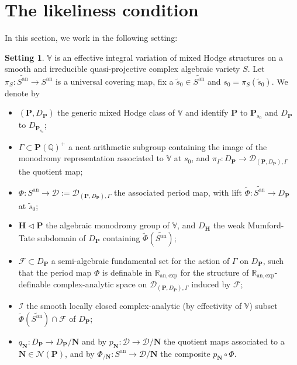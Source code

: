 \documentclass[10pt]{article}
\numberwithin{equation}{subsection}
\theoremstyle{plain}
\theoremstyle{definition}
\newtheorem{setting}[theorem]{Setting}
\theoremstyle{remark}
\newcommand{\I}{\mathscr{I}}
\newcommand{\F}{\mathscr{F}}
\newcommand{\anexp}{\mathbb{R}_\mathrm{an,exp}}
\newcommand{\Q}{\mathbb Q}
\newcommand{\V}{\mathbb V}
\newcommand{\pp}{\mathbf P}
\newcommand{\mon}{\mathbf H}
\newcommand{\NN}{\mathbf N}
\newcommand{\an}{\mathrm{an}}
\newcommand{\period}{\mathscr{D}}
\newcommand{\Np}{\mathcal{N}(\pp)}
\begin{document}
\section{The likeliness condition}\label{sect7}
In this section, we work in the following setting:
\begin{setting}\label{setting}
$\V$ is an effective integral variation of mixed Hodge structures on a smooth and irreducible quasi-projective complex algebraic variety $S$. Let $\pi_S : \widetilde{S^\an} \rightarrow S^\an$ is a universal covering map, fix a $\tilde{s}_0 \in \widetilde{S^\an}$ and $s_0 = \pi_S(\tilde{s}_0)$. We denote by
\begin{itemize}
\item $(\pp,D_\pp)$ the generic mixed Hodge class of $\V$ and identify $\pp$ to $\pp_{s_0}$ and $D_\pp$ to $D_{\pp_{s_0}}$;
\item $\Gamma \subset \pp(\Q)^+$ a neat arithmetic subgroup containing the image of the monodromy representation associated to $\V$ at $s_0$, and $\pi_\Gamma : D_\pp \rightarrow \period_{(\pp, D_\pp), \Gamma}$ the quotient map;
\item $\Phi : S^\an \rightarrow \period := \period_{(\pp,D_\pp), \Gamma}$ the associated period map, with lift $\tilde{\Phi} : \widetilde{S^\an} \rightarrow D_\pp$ at $\tilde{s}_0$;
\item $\mon \triangleleft \pp$ the algebraic monodromy group of $\V$, and $D_{\mon}$ the weak Mumford-Tate subdomain of $D_\pp$ containing $\tilde{\Phi}(\widetilde{S^\an})$;
\item $\F \subset D_\pp$ a semi-algebraic fundamental set for the action of $\Gamma$ on $D_\pp$, such that the period map $\Phi$ is definable in $\anexp$ for the structure of $\anexp$-definable complex-analytic space on $\period_{(\pp,D_\pp), \Gamma}$ induced by $\F$;
\item $\I$ the smooth locally closed complex-analytic (by effectivity of $\V$) subset $\tilde{\Phi}(\widetilde{S^\an}) \cap \F$ of $D_\pp$;
\item $q_\NN : D_\pp\rightarrow D_\pp/\NN$ and by $p_\NN : \period \rightarrow \period/\NN$ the quotient maps associated to a $\NN \in \Np$, and by $\Phi_{/\NN} : S^\an \rightarrow \period/\NN$ the composite $p_\NN \circ \Phi$.
\end{itemize}
\end{setting}
\end{document}
